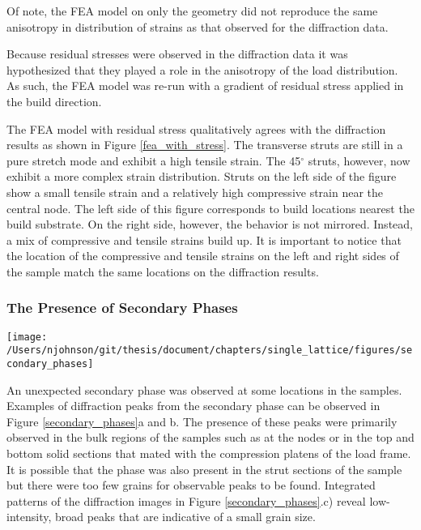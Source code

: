 Of note, the FEA model on only the geometry did not reproduce the same anisotropy in distribution of strains as that observed for the diffraction data. 

Because residual stresses were observed in the diffraction data it was hypothesized that they played a role in the anisotropy of the load distribution. As such, the FEA model was re-run with a gradient of residual stress applied in the build direction.

The FEA model with residual stress qualitatively agrees with the diffraction results as shown in Figure \ref{fea_with_stress}. The transverse struts are still in a pure stretch mode and exhibit a high tensile strain. The 45$^\circ$ struts, however, now exhibit a more complex strain distribution. Struts on the left side of the figure show a small tensile strain and a relatively high compressive strain near the central node. The left side of this figure corresponds to build locations nearest the build substrate. On the right side, however, the behavior is not mirrored. Instead, a mix of compressive and tensile strains build up. It is important to notice that the location of the compressive and tensile strains on the left and right sides of the sample match the same locations on the diffraction results.

\subsubsection{The Presence of Secondary Phases}
\begin{figure*}
	\texttt{[image: /Users/njohnson/git/thesis/document/chapters/single\_lattice/figures/secondary\_phases]}
	\caption{A secondary phase was observed present in the samples. Diffraction spots indicative of the secondary phase can be observed in a) and b). A logarithmic intensity plot of an integrated diffraction pattern demonstrates the presence of unexpected peaks, highlighted with red arrows in c). The same plot can be seen in linear intensity in d).}
	\label{secondary_phases}
\end{figure*}

An unexpected secondary phase was observed at some locations in the samples. Examples of diffraction peaks from the secondary phase can be observed in Figure \ref{secondary_phases}a and b. The presence of these peaks were primarily observed in the bulk regions of the samples such as at the nodes or in the top and bottom solid sections that mated with the compression platens of the load frame. It is possible that the phase was also present in the strut sections of the sample but there were too few grains for observable peaks to be found. Integrated patterns of the diffraction images in Figure \ref{secondary_phases}.c) reveal low-intensity, broad peaks that are indicative of a small grain size.

